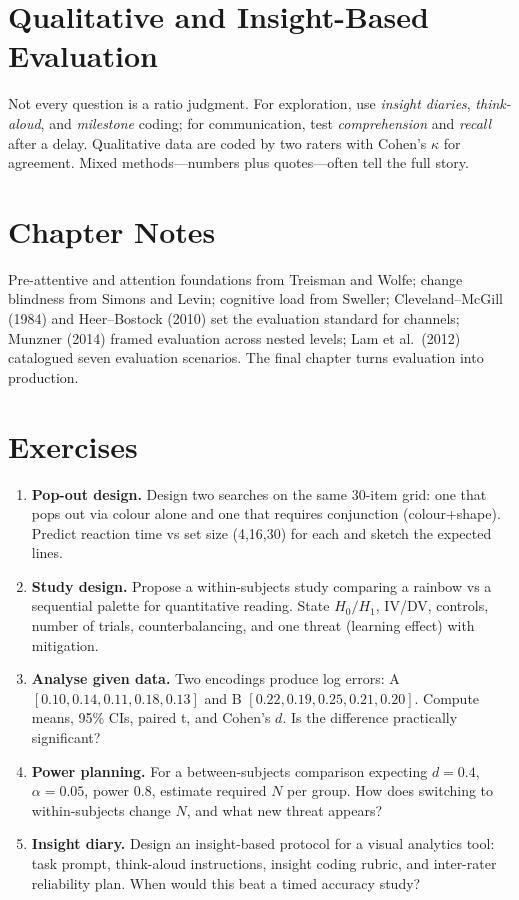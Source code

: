\section{Qualitative and Insight-Based Evaluation}
Not every question is a ratio judgment. For exploration, use \emph{insight diaries}, \emph{think-aloud}, and \emph{milestone} coding; for communication, test \emph{comprehension} and \emph{recall} after a delay. Qualitative data are coded by two raters with Cohen's $\kappa$ for agreement. Mixed methods---numbers plus quotes---often tell the full story.

\section{Chapter Notes}
Pre-attentive and attention foundations from Treisman and Wolfe; change blindness from Simons and Levin; cognitive load from Sweller; Cleveland--McGill (1984) and Heer--Bostock (2010) set the evaluation standard for channels; Munzner (2014) framed evaluation across nested levels; Lam et al.\ (2012) catalogued seven evaluation scenarios. The final chapter turns evaluation into production.

\section{Exercises}
\label{sec:ch07-exercises}
\begin{enumerate}[label=E7.\arabic*, leftmargin=*, itemsep=0.8em]
    \item \textbf{Pop-out design.} Design two searches on the same 30-item grid: one that pops out via colour alone and one that requires conjunction (colour+shape). Predict reaction time vs set size (4,16,30) for each and sketch the expected lines.
    \item \textbf{Study design.} Propose a within-subjects study comparing a rainbow vs a sequential palette for quantitative reading. State $H_0/H_1$, IV/DV, controls, number of trials, counterbalancing, and one threat (learning effect) with mitigation.
    \item \textbf{Analyse given data.} Two encodings produce log errors: A $[0.10,0.14,0.11,0.18,0.13]$ and B $[0.22,0.19,0.25,0.21,0.20]$. Compute means, 95\% CIs, paired t, and Cohen's $d$. Is the difference practically significant?
    \item \textbf{Power planning.} For a between-subjects comparison expecting $d=0.4$, $\alpha=0.05$, power $0.8$, estimate required $N$ per group. How does switching to within-subjects change $N$, and what new threat appears?
    \item \textbf{Insight diary.} Design an insight-based protocol for a visual analytics tool: task prompt, think-aloud instructions, insight coding rubric, and inter-rater reliability plan. When would this beat a timed accuracy study?
\end{enumerate}
